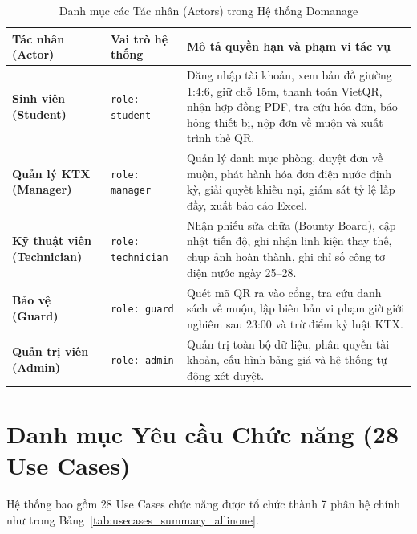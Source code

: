 \documentclass[12pt,a4paper,oneside]{report}
\begin{document}
\begin{table}[htbp]
\centering
\caption{Danh mục các Tác nhân (Actors) trong Hệ thống Domanage}
\label{tab:actors_allinone}
\small
\begin{tabularx}{\textwidth}{|l|l|X|}
\hline
\rowcolor{blue!10}
\textbf{Tác nhân (Actor)} & \textbf{Vai trò hệ thống} & \textbf{Mô tả quyền hạn và phạm vi tác vụ} \\ \hline
\textbf{Sinh viên (Student)} & \texttt{role: student} & Đăng nhập tài khoản, xem bản đồ giường 1:4:6, giữ chỗ 15m, thanh toán VietQR, nhận hợp đồng PDF, tra cứu hóa đơn, báo hỏng thiết bị, nộp đơn về muộn và xuất trình thẻ QR. \\ \hline
\textbf{Quản lý KTX (Manager)} & \texttt{role: manager} & Quản lý danh mục phòng, duyệt đơn về muộn, phát hành hóa đơn điện nước định kỳ, giải quyết khiếu nại, giám sát tỷ lệ lấp đầy, xuất báo cáo Excel. \\ \hline
\textbf{Kỹ thuật viên (Technician)} & \texttt{role: technician} & Nhận phiếu sửa chữa (Bounty Board), cập nhật tiến độ, ghi nhận linh kiện thay thế, chụp ảnh hoàn thành, ghi chỉ số công tơ điện nước ngày 25--28. \\ \hline
\textbf{Bảo vệ (Guard)} & \texttt{role: guard} & Quét mã QR ra vào cổng, tra cứu danh sách về muộn, lập biên bản vi phạm giờ giới nghiêm sau 23:00 và trừ điểm kỷ luật KTX. \\ \hline
\textbf{Quản trị viên (Admin)} & \texttt{role: admin} & Quản trị toàn bộ dữ liệu, phân quyền tài khoản, cấu hình bảng giá và hệ thống tự động xét duyệt. \\ \hline
\end{tabularx}
\end{table}

\section{Danh mục Yêu cầu Chức năng (28 Use Cases)}
Hệ thống bao gồm 28 Use Cases chức năng được tổ chức thành 7 phân hệ chính như trong Bảng~\ref{tab:usecases_summary_allinone}.
\end{document}

